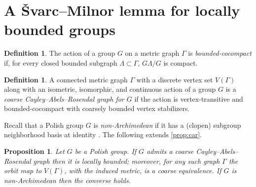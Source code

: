 \documentclass[twoside]{amsart}
\theoremstyle{plain}
\newtheorem{proposition}[theorem]{Proposition}
\theoremstyle{break}
\theoremstyle{definition}
\newtheorem{definition}[theorem]{Definition}
\theoremstyle{remark}
\newtheorem{remark*}[theorem]{Remark}
\begin{document}
\section{A \v Svarc--Milnor lemma for locally bounded
groups}\label{sec:ccar}

\begin{definition}\label{def:bccpt} 
  The action of a group $G$ on a metric graph $\Gamma$ is \textit{bounded-cocompact}
  if, for every closed bounded subgraph $\Lambda \subset \Gamma$, $G\Lambda/G$ is compact.
\end{definition}

\begin{definition}\label{def:ccar}
 A connected metric graph $\Gamma$ with a discrete vertex set $V(\Gamma)$ along with an
 isometric, isomorphic, and continuous action of a group $G$ is a 
 \textit{coarse Cayley--Abels--Rosendal graph for $G$}
  if the action is vertex-transitive and
 bounded-cocompact with coarsely bounded vertex stabilizers.
\end{definition}


Recall that a Polish group $G$ is \textit{non-Archimedean} if it has a
(clopen) subgroup neighborhood basis at identity \cite{kechris}.  The following
extends \cref{prop:car}.

\begin{proposition}\label{prop:ccar}
 Let $G$ be a Polish group. If $G$ 
 admits a coarse Cayley--Abels--Rosendal graph then it is locally
 bounded; moreover, for
 any such graph $\Gamma$ the orbit map to 
 $V(\Gamma)$, with the induced metric,
 is a coarse equivalence.  
 If $G$ is non-Archimedean then the converse holds.
\end{proposition}
\end{document}

